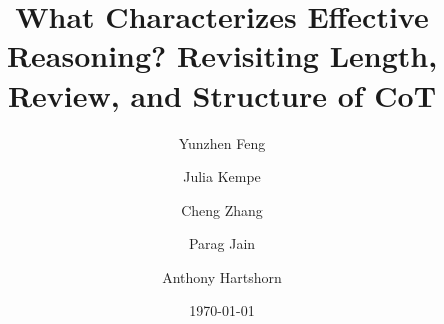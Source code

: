\documentclass[]{fairmeta}
\title{What Characterizes Effective Reasoning? Revisiting Length, Review, and Structure of CoT}
\author[1,2,*]{Yunzhen Feng}
\author[1,2,\dagger]{Julia Kempe}
\author[1,\dagger]{Cheng Zhang}
\author[1,\dagger]{Parag Jain}
\author[1,\dagger]{Anthony Hartshorn}
\affiliation[1]{Meta Superintelligence Labs}
\affiliation[2]{New York University}
\date{\today}
\begin{document}
\maketitle


% 



% 










% 

\clearpage
\newpage







\clearpage
\newpage
\beginappendix


\end{document}
